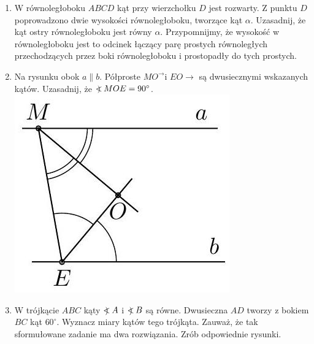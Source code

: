 \documentclass[10pt]{article}
\newcommand\Varangle{\mathop{{<\!\!\!\!\!\text{\small)}}\:}\nolimits}
\begin{document}
\begin{enumerate}
  \item W równoległoboku \(A B C D\) kąt przy wierzchołku \(D\) jest rozwarty. Z punktu \(D\) poprowadzono dwie wysokości równoległoboku, tworzące kąt \(\alpha\). Uzasadnij, że kąt ostry równoległoboku jest równy \(\alpha\). Przypomnijmy, że wysokość w równoległoboku jest to odcinek łączący parę prostych równoległych przechodzących przez boki równoległoboku i prostopadły do tych prostych.
  \item Na rysunku obok \(a \| b\). Półproste \(M O^{\rightarrow} \mathrm{i}\) \(E O \rightarrow\) są dwusiecznymi wskazanych kątów. Uzasadnij, że \(\Varangle M O E=90^{\circ}\).\\
\includegraphics[max width=\textwidth, center]{2024_11_21_71f62bd117d375398909g-021}
  \item W trójkącie \(A B C\) kąty \(\Varangle A\) i \(\Varangle B\) są równe. Dwusieczna \(A D\) tworzy z bokiem \(B C\) kąt \(60^{\circ}\). Wyznacz miary kątów tego trójkąta. Zauważ, że tak sformułowane zadanie ma dwa rozwiązania. Zrób odpowiednie rysunki.
\end{enumerate}
\end{document}

